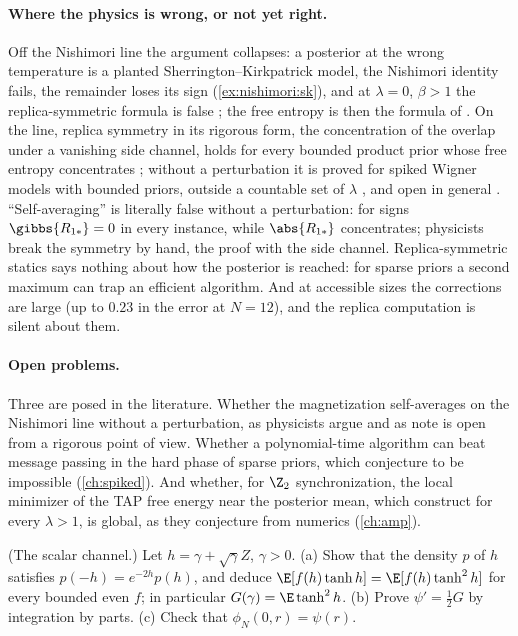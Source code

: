 \begin{refsection}
\paragraph{Where the physics is wrong, or not yet right.} Off the Nishimori line the argument collapses: a posterior at the wrong temperature is a planted Sherrington--Kirkpatrick model, the Nishimori identity fails, the remainder loses its sign (\cref{ex:nishimori:sk}), and at $\lambda=0$, $\beta>1$ the replica-symmetric formula is false \parencite{Toninelli2002}; the free entropy is then the formula of \textcite{Chen2014}. On the line, replica symmetry in its rigorous form, the concentration of the overlap under a vanishing side channel, holds for every bounded product prior whose free entropy concentrates \parencite[Thm.~2.1]{BarbierPanchenko2022}; without a perturbation it is proved for spiked Wigner models with bounded priors, outside a countable set of $\lambda$ \parencite[Thm.~2]{LelargeMiolane2019}, and open in general \parencite[\S II.G]{ZdeborovaKrzakala2016}. ``Self-averaging'' is literally false without a perturbation: for signs $\gibbs{R_{1*}}=0$ in every instance, while $\abs{R_{1*}}$ concentrates; physicists break the symmetry by hand, the proof with the side channel. Replica-symmetric statics says nothing about how the posterior is reached: for sparse priors a second maximum can trap an efficient algorithm. And at accessible sizes the corrections are large (up to $0.23$ in the error at $N=12$), and the replica computation is silent about them.

\paragraph{Open problems.} Three are posed in the literature. Whether the magnetization self-averages on the Nishimori line without a perturbation, as physicists argue and as \textcite[\S II.G]{ZdeborovaKrzakala2016} note is open from a rigorous point of view. Whether a polynomial-time algorithm can beat message passing in the hard phase of sparse priors, which \textcite[\S IV C]{LesieurKrzakalaZdeborova2017} conjecture to be impossible (\cref{ch:spiked}). And whether, for $\Z_2$ synchronization, the local minimizer of the TAP free energy near the posterior mean, which \textcite{CelentanoFanMei2023} construct for every $\lambda>1$, is global, as they conjecture from numerics (\cref{ch:amp}).

\begin{exercises}
\item \consolidation (The scalar channel.) Let $h=\gamma+\sqrt\gamma Z$, $\gamma>0$. (a) Show that the density $p$ of $h$ satisfies $p(-h)=e^{-2h}p(h)$, and deduce $\E[f(h)\tanh h]=\E[f(h)\tanh^2h]$ for every bounded even $f$; in particular $G(\gamma)=\E\tanh^2h$. (b) Prove $\psi'=\frac12G$ by integration by parts. (c) Check that $\phi_N(0,r)=\psi(r)$.\label{ex:nishimori:scalar}


\end{exercises}
\end{refsection}

